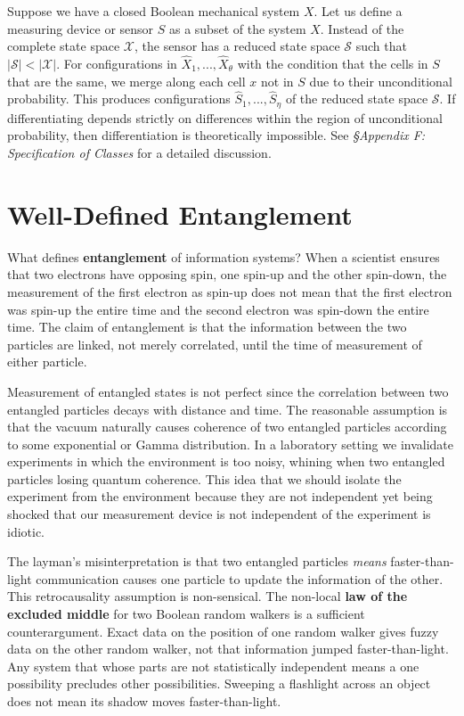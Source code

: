 \documentclass[10pt, a5paper, twoside, openright]{memoir}
\begin{document}
Suppose we have a closed Boolean mechanical system $X$. Let us define a measuring device or sensor $S$ as a subset of the system $X$. Instead of the complete state space $\mathcal X$, the sensor has a reduced state space $\mathcal S$ such that $|\mathcal S| < |\mathcal X|$. For configurations in $\hat X_1,...,\hat X_\theta$ with the condition that the cells in $S$ that are the same, we merge along each cell $x$ not in $S$ due to their unconditional probability. This produces configurations $\hat S_1,..., \hat S_\eta$ of the reduced state space $\mathcal S$. If differentiating depends strictly on differences within the region of unconditional probability, then differentiation is theoretically impossible. See \textit{\S Appendix F: Specification of Classes} for a detailed discussion.

\section{Well-Defined Entanglement}
What defines \textbf{entanglement} of information systems? When a scientist ensures that two electrons have opposing spin, one spin-up and the other spin-down, the measurement of the first electron as spin-up does not mean that the first electron was spin-up the entire time and the second electron was spin-down the entire time. The claim of entanglement is that the information between the two particles are linked, not merely correlated, until the time of measurement of either particle.

Measurement of entangled states is not perfect since the correlation between two entangled particles decays with distance and time. The reasonable assumption is that the vacuum naturally causes coherence of two entangled particles according to some exponential or Gamma distribution. In a laboratory setting we invalidate experiments in which the environment is too noisy, whining when two entangled particles losing quantum coherence. This idea that we should isolate the experiment from the environment because they are not independent yet being shocked that our measurement device is not independent of the experiment is idiotic.

The layman's misinterpretation is that two entangled particles \textit{means} faster-than-light communication causes one particle to update the information of the other. This retrocausality assumption is non-sensical. The non-local \textbf{law of the excluded middle} for two Boolean random walkers is a sufficient counterargument. Exact data on the position of one random walker gives fuzzy data on the other random walker, not that information jumped faster-than-light. Any system that whose parts are not statistically independent means a one possibility precludes other possibilities. Sweeping a flashlight across an object does not mean its shadow moves faster-than-light.
\end{document}

